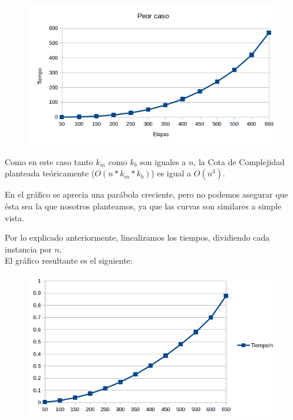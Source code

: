   \newpage

  \begin{figure}[h!]
   \begin{center}
	\includegraphics[scale=0.8]{imagenes/ej1/peorCaso1.png}
   \end{center}
  \end{figure}
  
  Como en este caso tanto $k_m$ como $k_b$ son iguales a $n$, la Cota de Complejidad planteada te\'oricamente ($O(n* k_m* k_b)$) es igual a $O(n^3)$.
  
  En el gr\'afico se aprecia una par\'abola creciente, pero no podemos asegurar que \'esta sea la que nosotros planteamos, ya que las curvas son similares a simple vista.

      
        Por lo explicado anteriormente, linealizamos los tiempos, dividiendo cada instancia por $n$.\\
        
  El gr\'afico resultante es el siguiente:
  
  \begin{figure}[h!]
   \begin{center}
	\includegraphics[scale=0.8]{imagenes/ej1/peorCaso2.png}
   \end{center}
  \end{figure}
  
